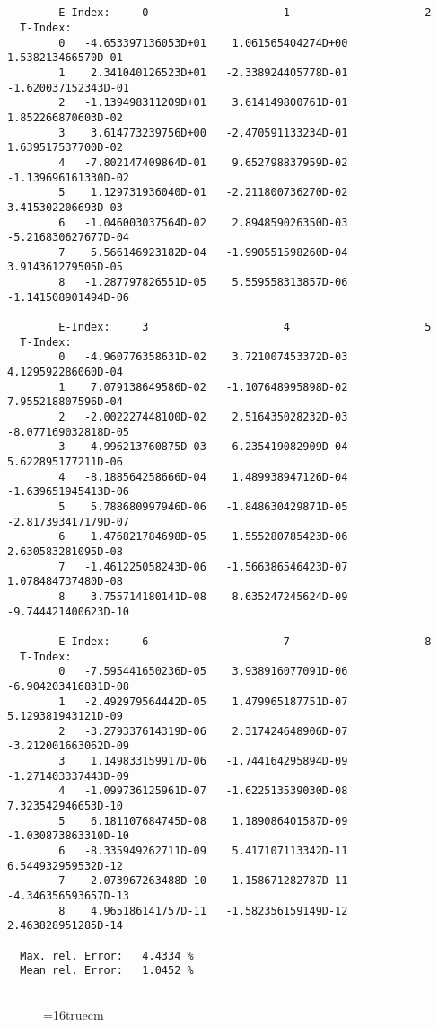 \documentclass[12pt,dvipdfmx]{article}
\begin{document}
\begin{small}\begin{verbatim}


        E-Index:     0                     1                     2
  T-Index:
        0   -4.653397136053D+01    1.061565404274D+00    1.538213466570D-01
        1    2.341040126523D+01   -2.338924405778D-01   -1.620037152343D-01
        2   -1.139498311209D+01    3.614149800761D-01    1.852266870603D-02
        3    3.614773239756D+00   -2.470591133234D-01    1.639517537700D-02
        4   -7.802147409864D-01    9.652798837959D-02   -1.139696161330D-02
        5    1.129731936040D-01   -2.211800736270D-02    3.415302206693D-03
        6   -1.046003037564D-02    2.894859026350D-03   -5.216830627677D-04
        7    5.566146923182D-04   -1.990551598260D-04    3.914361279505D-05
        8   -1.287797826551D-05    5.559558313857D-06   -1.141508901494D-06

        E-Index:     3                     4                     5
  T-Index:
        0   -4.960776358631D-02    3.721007453372D-03    4.129592286060D-04
        1    7.079138649586D-02   -1.107648995898D-02    7.955218807596D-04
        2   -2.002227448100D-02    2.516435028232D-03   -8.077169032818D-05
        3    4.996213760875D-03   -6.235419082909D-04    5.622895177211D-06
        4   -8.188564258666D-04    1.489938947126D-04   -1.639651945413D-06
        5    5.788680997946D-06   -1.848630429871D-05   -2.817393417179D-07
        6    1.476821784698D-05    1.555280785423D-06    2.630583281095D-08
        7   -1.461225058243D-06   -1.566386546423D-07    1.078484737480D-08
        8    3.755714180141D-08    8.635247245624D-09   -9.744421400623D-10

        E-Index:     6                     7                     8
  T-Index:
        0   -7.595441650236D-05    3.938916077091D-06   -6.904203416831D-08
        1   -2.492979564442D-05    1.479965187751D-07    5.129381943121D-09
        2   -3.279337614319D-06    2.317424648906D-07   -3.212001663062D-09
        3    1.149833159917D-06   -1.744164295894D-09   -1.271403337443D-09
        4   -1.099736125961D-07   -1.622513539030D-08    7.323542946653D-10
        5    6.181107684745D-08    1.189086401587D-09   -1.030873863310D-10
        6   -8.335949262711D-09    5.417107113342D-11    6.544932959532D-12
        7   -2.073967263488D-10    1.158671282787D-11   -4.346356593657D-13
        8    4.965186141757D-11   -1.582356159149D-12    2.463828951285D-14

  Max. rel. Error:   4.4334 %
  Mean rel. Error:   1.0452 %


\end{verbatim}\end{small}
\begin{figure} \label{2.2c}
\epsfxsize=16truecm
\end{figure}
\newpage
\end{document}
